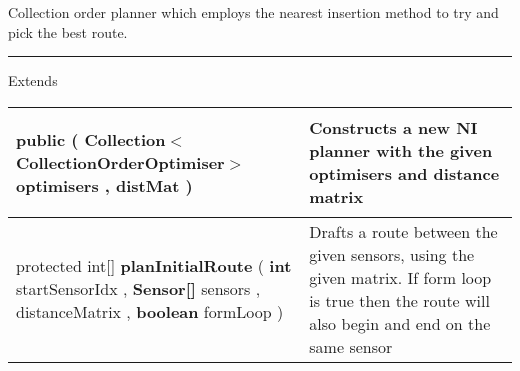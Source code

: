  {\scriptsize Collection order planner which employs the nearest insertion method to try and pick the best route.
 
\vspace*{4pt} \hrule \vspace*{3pt}
Extends \textbf{ \hyperref[tab:BaseCollectionOrderPlanner]{\color{blue}{BaseCollectionOrderPlanner}} }
\vspace*{-5pt} 
\begin{tabularx}{\linewidth}{X|m{}}
\label{tab:NearestInsertionCollectionOrderPlanner}
\begin{raggedleft}public  \textbf{\hyperref[tab:NearestInsertionCollectionOrderPlanner]{\color{blue}{NearestInsertionCollectionOrderPlanner}} }(\newline \hfill 
\hspace*{ 5pt} \textbf{Collection$<$CollectionOrderOptimiser$>$} optimisers , \newline
 \hspace*{ 5pt} \textbf{\hyperref[tab:DistanceMatrix]{\color{blue}{DistanceMatrix}}} distMat  )
\end{raggedleft} &
 Constructs a new NI planner with the given optimisers and distance matrix\\ \hline 
\begin{raggedleft}protected int{[}{]} \textbf{planInitialRoute }(\newline \hfill 
\hspace*{ 5pt} \textbf{int} startSensorIdx , \newline
 \hspace*{ 5pt} \textbf{Sensor{[}{]}} sensors , \newline
 \hspace*{ 5pt} \textbf{\hyperref[tab:DistanceMatrix]{\color{blue}{DistanceMatrix}}} distanceMatrix , \newline
 \hspace*{ 5pt} \textbf{boolean} formLoop  )
\end{raggedleft} &
 Drafts a route between the given sensors, using the given matrix. If form loop is true then the route will also begin and end on the same sensor\\\end{tabularx}
}
